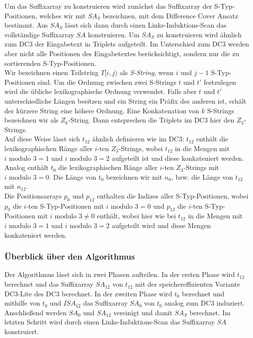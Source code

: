 Um das Suffixarray zu konstruieren wird zunächst das Suffixarray der S-Typ-Positionen, welches wir mit $SA_S$ bezeichnen, mit dem Difference Cover Ansatz bestimmt. Aus $SA_S$ lässt sich dann durch einen Links-Induktions-Scan das vollständige Suffixarray $SA$ konstruieren. Um $SA_S$ zu konstruieren wird ähnlich zum DC3 der Eingabetext in Triplets aufgeteilt. Im Unterschied zum DC3 werden aber nicht alle Positionen des Eingabetextes berücksichtigt, sondern nur die zu sortierenden S-Typ-Positionen. \\
Wir bezeichnen einen Teilstring $T[i,j)$ als \textit{S-String}, wenn $i$ und $j-1$ S-Typ-Positionen sind. Um die Ordnung zwischen zwei S-Strings $t$ und $t'$ festzulegen wird die übliche lexikographische Ordnung verwendet. Falls aber $t$ und $t'$ unterschiedliche Längen besitzen und ein String ein Präfix des anderen ist, erhält der kürzere String eine höhere Ordnung.  Eine Konkatenation von $k$ S-Strings bezeichnen wir als $Z_k$-String. Dann entsprechen die Triplets im DC3 hier den $Z_3$-Strings. \\
Auf diese Weise lässt sich $t_{12}$ ähnlich definieren wie im DC3: $t_{12}$ enthält die lexikographischen Ränge aller $i$-ten $Z_3$-Strings, wobei $t_{12}$ in die Mengen mit $i \text{ modulo } 3 = 1$ und $i \text{ modulo } 3 = 2$ aufgeteilt ist und diese konkateniert werden. Analog enthält $t_0$ die lexikographischen Ränge aller $i$-ten $Z_3$-Strings mit $i \text{ modulo } 3 = 0$. Die Länge von $t_0$ bezeichnen wir mit $n_0$, bzw. die Länge von $t_{12}$ mit $n_{12}$.\\
Die Positionsarrays $p_0$ und $p_{12}$ enthalten die Indizes aller S-Typ-Positionen, wobei $p_0$ die $i$-ten S-Typ-Positionen mit $i \text{ modulo } 3 = 0$ und $p_{12}$ die $i$-ten S-Typ-Positionen mit $i \text{ modulo } 3 \ne 0$ enthält, wobei hier wie bei $t_{12}$ in die Mengen mit $i \text{ modulo } 3 = 1$ und $i \text{ modulo } 3 = 2$ aufgeteilt wird und diese Mengen konkateniert werden. \\

\subsubsection{Überblick über den Algorithmus}

Der Algorithmus lässt sich in zwei Phasen aufteilen. In der ersten Phase wird $t_{12}$ berechnet und das Suffixarray $SA_{12}$ von $t_{12}$ mit der speichereffizienten Variante DC3-Lite des DC3 berechnet. In der zweiten Phase wird $t_0$ berechnet und mithilfe von $t_0$ und $ISA_{12}$ das Suffixarray $SA_0$ von $t_0$ analog zum DC3 induziert. Anschließend werden $SA_0$ und $SA_{12}$ vereinigt und damit $SA_S$ berechnet. Im letzten Schritt wird durch einen Links-Induktions-Scan das Suffixarray $SA$ konstruiert. \\

